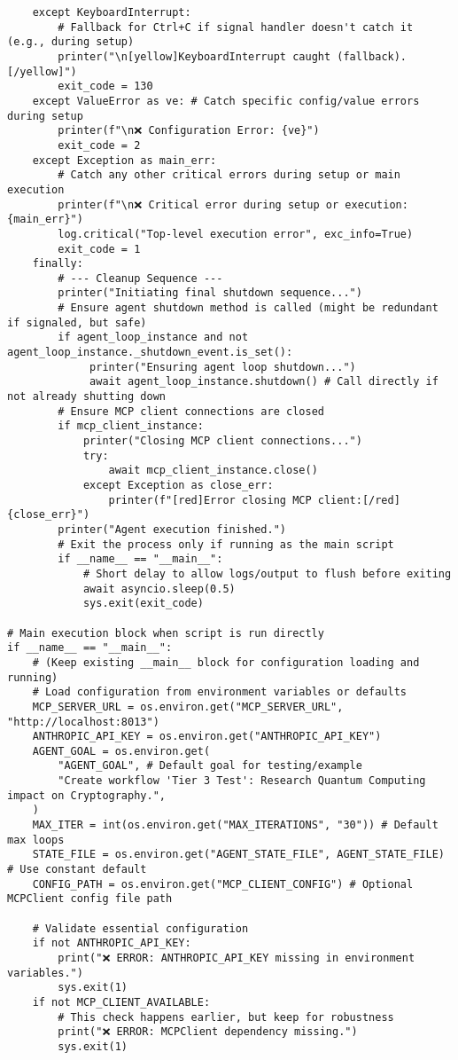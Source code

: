 \documentclass[12pt,a4paper]{article}
\begin{document}
\begin{pageablecode}
\begin{verbatim}
    except KeyboardInterrupt:
        # Fallback for Ctrl+C if signal handler doesn't catch it (e.g., during setup)
        printer("\n[yellow]KeyboardInterrupt caught (fallback).[/yellow]")
        exit_code = 130
    except ValueError as ve: # Catch specific config/value errors during setup
        printer(f"\n❌ Configuration Error: {ve}")
        exit_code = 2
    except Exception as main_err:
        # Catch any other critical errors during setup or main execution
        printer(f"\n❌ Critical error during setup or execution: {main_err}")
        log.critical("Top-level execution error", exc_info=True)
        exit_code = 1
    finally:
        # --- Cleanup Sequence ---
        printer("Initiating final shutdown sequence...")
        # Ensure agent shutdown method is called (might be redundant if signaled, but safe)
        if agent_loop_instance and not agent_loop_instance._shutdown_event.is_set():
             printer("Ensuring agent loop shutdown...")
             await agent_loop_instance.shutdown() # Call directly if not already shutting down
        # Ensure MCP client connections are closed
        if mcp_client_instance:
            printer("Closing MCP client connections...")
            try:
                await mcp_client_instance.close()
            except Exception as close_err:
                printer(f"[red]Error closing MCP client:[/red] {close_err}")
        printer("Agent execution finished.")
        # Exit the process only if running as the main script
        if __name__ == "__main__":
            # Short delay to allow logs/output to flush before exiting
            await asyncio.sleep(0.5)
            sys.exit(exit_code)

# Main execution block when script is run directly
if __name__ == "__main__":
    # (Keep existing __main__ block for configuration loading and running)
    # Load configuration from environment variables or defaults
    MCP_SERVER_URL = os.environ.get("MCP_SERVER_URL", "http://localhost:8013")
    ANTHROPIC_API_KEY = os.environ.get("ANTHROPIC_API_KEY")
    AGENT_GOAL = os.environ.get(
        "AGENT_GOAL", # Default goal for testing/example
        "Create workflow 'Tier 3 Test': Research Quantum Computing impact on Cryptography.",
    )
    MAX_ITER = int(os.environ.get("MAX_ITERATIONS", "30")) # Default max loops
    STATE_FILE = os.environ.get("AGENT_STATE_FILE", AGENT_STATE_FILE) # Use constant default
    CONFIG_PATH = os.environ.get("MCP_CLIENT_CONFIG") # Optional MCPClient config file path

    # Validate essential configuration
    if not ANTHROPIC_API_KEY:
        print("❌ ERROR: ANTHROPIC_API_KEY missing in environment variables.")
        sys.exit(1)
    if not MCP_CLIENT_AVAILABLE:
        # This check happens earlier, but keep for robustness
        print("❌ ERROR: MCPClient dependency missing.")
        sys.exit(1)


\end{verbatim}
\end{pageablecode}
\end{document}
